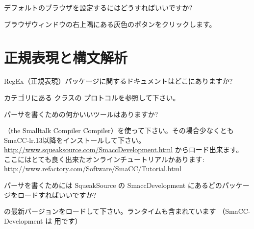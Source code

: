\documentclass[a4paper,10pt,twoside]{book}
\begin{document}
\begin{faq}
デフォルトのブラウザを設定するにはどうすればいいですか?
\end{faq}
\answer
ブラウザウィンドウの右上隅にある灰色のボタンをクリックします。

\section{正規表現と構文解析}


\begin{faq}
RegEx（正規表現）パッケージに関するドキュメントはどこにありますか?
\end{faq}
\answer
{} カテゴリにある  クラスの  プロトコルを参照して下さい。

\begin{faq}
パーサを書くための何かいいツールはありますか?
\end{faq}
\answer
{}（the Smalltalk Compiler Compiler）を使って下さい。その場合少なくともSmaCC-lr.13以降をインストールして下さい。
\url{http://www.squeaksource.com/SmaccDevelopment.html} からロード出来ます。
ここにはとても良く出来たオンラインチュートリアルかあります:
\url{http://www.refactory.com/Software/SmaCC/Tutorial.html}

\begin{faq}
パーサを書くためには SqueakSource の SmaccDevelopment にあるどのパッケージをロードすればいいですか?
\end{faq}
\answer
{} の最新バージョンをロードして下さい。ランタイムも含まれています
（SmaCC-Development は  用です）

\ifx\wholebook\relax\else
\end{document}
